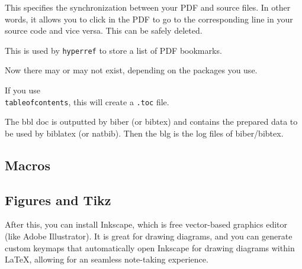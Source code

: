   \begin{definition}
    \label{def:paper-synctex-gz}
    This specifies the synchronization between your PDF and source files. In other words, it allows you to click in the PDF to go to the corresponding line in your source code and vice versa. This can be safely deleted. 
  \end{definition}

  \begin{definition}
    \label{def:paper-out}
    This is used by \texttt{hyperref} to store a list of PDF bookmarks. 
  \end{definition}

  Now there may or may not exist, depending on the packages you use. 

  \begin{definition}
    \label{def:paper-toc}
    If you use \texttt{\\tableofcontents}, this will create a \texttt{.toc} file. 
  \end{definition}

  \begin{definition}
    \label{def:paper-bbl-blg}
    The bbl doc is outputted by biber (or bibtex) and contains the prepared data to be used by biblatex (or natbib). Then the blg is the log files of biber/bibtex. 
  \end{definition}

  \begin{definition}
    \label{def:paper-fls}
    
  \end{definition}


\subsection{Macros}

\subsection{Figures and Tikz}

  After this, you can install Inkscape, which is free vector-based graphics editor (like Adobe Illustrator). It is great for drawing diagrams, and you can generate custom keymaps that automatically open Inkscape for drawing diagrams within LaTeX, allowing for an seamless note-taking experience.  



